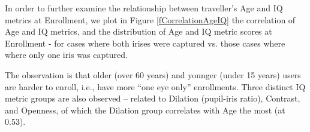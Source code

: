 \documentclass{cta-author}%
\newcommand{\cmt}[1]{}
\begin{document}
In order to further examine the relationship between traveller's Age and IQ metrics at Enrollment, we plot in Figure \ref{fCorrelationAgeIQ} 
the correlation of Age and IQ metrics, and  the distribution of  Age and IQ metric scores at Enrollment - for cases where both irises were captured vs. those cases where  where only one iris was captured.  

The observation is that  older (over 60 years) and younger (under 15 years) users are harder to enroll, i.e.,  have more ``one eye only'' enrollments.
Three distinct IQ metric groups  are also observed --  related to Dilation (pupil-iris ratio), Contrast, and Openness, 
of which the Dilation group correlates with Age the most (at 0.53).


\cmt{
Figure \ref{fCorrelationAgeIQ} 
shows the distribution for traveller's Age and IQ metrics at Enrollment for cases where both irises were captured vs. those cases where  where only one iris was captured. 
and the correlation of age and IQ metrics.%

The following observations are made. 
First, it is observed that older (over 60 years) and younger (under 15 years) users are harder to enroll, i.e.,  have more ``one eye only'' enrollments.
Second, among three distinct IQ metric groups  (related to Dilation (pupil-iris ratio), Contrast,  Openness), Age is found to weakly correlate with Dilation  (0.53) and Contrast  (0.25).
Finally, it is observed that
Dilation monotonically decreases with age for adults,  and  that all  IQ metrics also vary with age for young users. 
This explains lower number of iris enrollments for older and young users. This is also why one may expect worse performance for these groups of people at the Passage stage.
}
\end{document}
